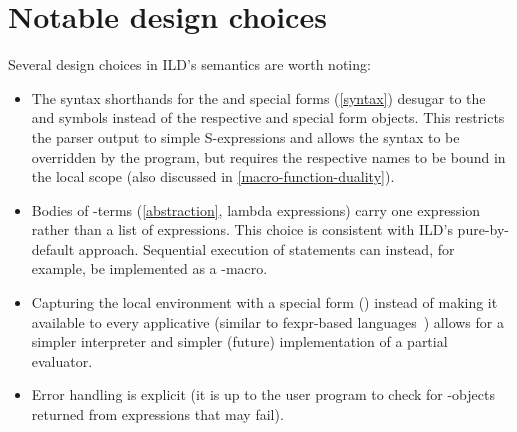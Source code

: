 \section{Notable design choices}
\label{design-choices}
Several design choices in ILD's semantics are worth noting:
\begin{itemize}
\item The syntax shorthands for the  and 
special forms (\cref{syntax}) desugar to the  and 
symbols instead of the respective  and  special form objects.
This restricts the parser output to simple S-expressions and allows the syntax to be
overridden by the program, but requires the respective names to be bound in the local
scope (also discussed in \cref{macro-function-duality}).
\item Bodies of \ildsetAbstr-terms (\cref{abstraction}, lambda expressions)
carry one expression rather than
a list of expressions. This choice is consistent with ILD's pure-by-default approach.
Sequential execution of statements can instead, for example, be implemented as a -macro.
\item Capturing the local environment with a special form () instead
of making it available to every applicative (similar to fexpr-based languages~\cite{kernel-report})
allows for a simpler interpreter and simpler (future) implementation of a partial evaluator.
\item Error handling is explicit (it is up to the user program to check for \ildfailbare-objects
returned from expressions that may fail).
\end{itemize}

